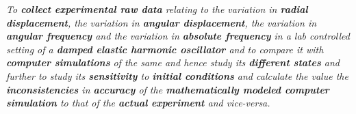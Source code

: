 \textit{To \textbf{collect experimental raw data} relating to the variation in \textbf{radial displacement}, the variation in \textbf{angular displacement}, the variation in \textbf{angular frequency} and the variation in \textbf{absolute frequency} in a lab controlled setting of a \textbf{damped elastic harmonic oscillator} and to compare it with \textbf{computer simulations} of the same and hence study its \textbf{different states} and further to study its \textbf{sensitivity} to \textbf{initial conditions} and calculate the value the \textbf{inconsistencies} in \textbf{accuracy} of the \textbf{mathematically modeled computer simulation} to that of the \textbf{actual experiment} and vice-versa.}
